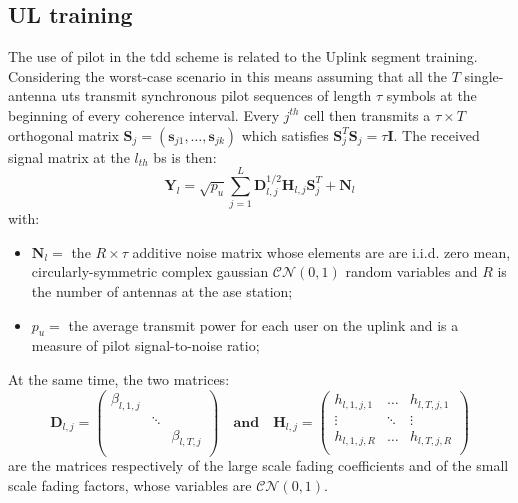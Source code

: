 \documentclass[11pt]{book}
\begin{document}
\subsection{UL training}
The use of pilot in the \gls{tdd} scheme is related to the Uplink segment training. Considering the worst-case scenario in this means assuming that all the $T$ single-antenna \gls{ut}s transmit synchronous pilot sequences of length $\tau$ symbols at the beginning of every coherence interval. Every $j^{th}$ cell then transmits a $\tau \times T$ orthogonal matrix $\textbf{S}_j = (\textbf{s}_{j1},\dots,\textbf{s}_{jk})$ which satisfies $\textbf{S}_j^T\textbf{S}_j = \tau \textbf{I}$. The received signal matrix at the $l_{th}$ \gls{bs} is then:
\begin{equation}
\textbf{Y}_l = \sqrt{p_u}\sum_{j=1}^{L}\textbf{D}_{l,j}^{1/2}\textbf{H}_{l,j}\textbf{S}_j^T + \textbf{N}_l
\label{eq:recSignal}
\end{equation}
with:
\begin{itemize}
  \item $\textbf{N}_l = $ the $R \times \tau$ additive noise matrix whose elements are are i.i.d. zero mean, circularly-symmetric complex gaussian $\mathcal{CN}(0,1)$ random variables and $R$ is the number of antennas at the ase station;\\
  \item $p_u = $ the average transmit power for each user on the uplink and is a measure of pilot signal-to-noise ratio;
\end{itemize}
At the same time, the two matrices:
  \begin{equation*}
    \textbf{D}_{l,j} =
    \begin{pmatrix}
      \beta_{l,1,j} &        &              \\
                    & \ddots &              \\
                    &        & \beta_{l,T,j}\\
    \end{pmatrix}
    \quad \textbf{and} \quad
    \textbf{H}_{l,j} =
    \begin{pmatrix}
      h_{l,1,j,1} & \dots  & h_{l,T,j,1}\\
      \vdots      & \ddots & \vdots\\
      h_{l,1,j,R} & \dots & h_{l,T,j,R}\\
    \end{pmatrix}
  \end{equation*}
  are the matrices respectively of the large scale fading coefficients and of the small scale fading factors, whose variables are $\mathcal{CN}(0,1)$.\\
\end{document}
